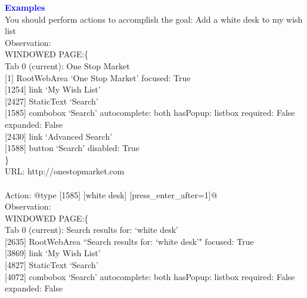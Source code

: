 \begin{tcolorbox}[breakable,title=Prompt Details for WebArena ]
\textbf{\textcolor{blue}{Examples}}\\
\textnormal{You should perform actions to accomplish the goal: Add a white desk to my wish list}\\
\textnormal{Observation:}\\
\textnormal{WINDOWED PAGE:\{}\\
\textnormal{Tab 0 (current): One Stop Market}\\
\textnormal{[1] RootWebArea `One Stop Market' focused: True}\\
\textnormal{\hspace*{5mm}[1254] link `My Wish List'}\\
\textnormal{\hspace*{5mm}[2427] StaticText `Search'}\\
\textnormal{\hspace*{5mm}[1585] combobox `Search' autocomplete: both hasPopup: listbox required: False expanded: False}\\
\textnormal{\hspace*{5mm}[2430] link `Advanced Search'}\\
\textnormal{\hspace*{5mm}[1588] button `Search' disabled: True}\\
\textnormal{\}}\\
\textnormal{URL: http://onestopmarket.com}\\
\\
\textnormal{Action: @type [1585] [white desk] [press\_enter\_after=1]@}\\
\textnormal{Observation:}\\
\textnormal{WINDOWED PAGE:\{}\\
\textnormal{Tab 0 (current): Search results for: `white desk'}\\
\textnormal{[2635] RootWebArea ``Search results for: `white desk'" focused: True}\\
\textnormal{\hspace*{5mm}[3869] link `My Wish List'}\\
\textnormal{\hspace*{5mm}[4827] StaticText `Search'}\\
\textnormal{\hspace*{5mm}[4072] combobox `Search' autocomplete: both hasPopup: listbox required: False expanded: False}\\

\end{tcolorbox}
